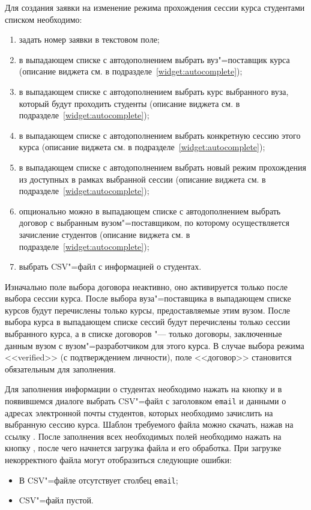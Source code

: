 Для создания заявки на изменение режима прохождения сессии курса студентами списком необходимо:
\begin{enumerate}
	\item задать номер заявки в текстовом поле;
	\item в выпадающем списке с автодополнением выбрать вуз"=поставщик курса
	(описание виджета см. в подразделе~\ref{widget:autocomplete});
	\item в выпадающем списке с автодополнением выбрать курс выбранного вуза, который будут проходить студенты 
	(описание виджета см. в подразделе~\ref{widget:autocomplete});
	\item в выпадающем списке с автодополнением выбрать конкретную сессию этого курса 
	(описание виджета см. в подразделе~\ref{widget:autocomplete});
	\item в выпадающем списке с автодополнением выбрать новый режим прохождения из доступных в рамках выбранной сессии 
	(описание виджета см. в подразделе~\ref{widget:autocomplete});
	\item опционально можно в выпадающем списке с автодополнением выбрать договор с выбранным вузом"=поставщиком, 
	по которому осуществляется зачисление студентов (описание виджета см. в подразделе~\ref{widget:autocomplete});
	\item выбрать CSV"=файл с информацией о студентах.
\end{enumerate}

Изначально поле выбора договора неактивно, оно активируется только после выбора сессии курса.
После выбора вуза"=поставщика в выпадающем списке курсов будут перечислены только курсы, предоставляемые этим вузом.
После выбора курса в выпадающем списке сессий будут перечислены только сессии выбранного курса, 
а в списке договоров "--- только договоры, заключенные данным вузом с вузом"=разработчиком для этого курса.
В случае выбора режима <<verified>> (с подтверждением личности), поле <<договор>> становится обязательным для заполнения. 

Для заполнения информации о студентах необходимо нажать на кнопку  и в появившемся диалоге выбрать CSV"=файл 
с заголовком {\tt email} и данными о адресах электронной почты студентов, которых необходимо зачислить на выбранную сессию курса. 
Шаблон требуемого файла можно скачать, нажав на ссылку .
После заполнения всех необходимых полей необходимо нажать на кнопку , 
после чего начнется загрузка файла и его обработка. При загрузке некорректного файла могут отобразиться следующие ошибки:
\begin{itemize}
	\item В CSV"=файле отсутствует столбец {\tt email};
	\item CSV"=файл пустой.
\end{itemize} 

